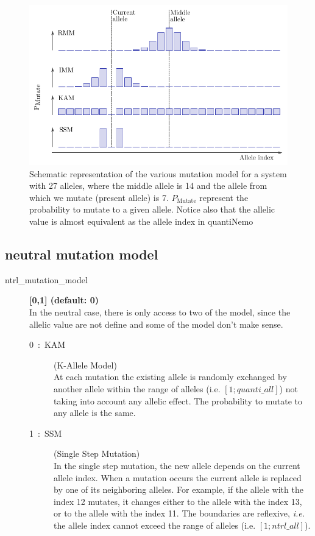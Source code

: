 \documentclass[letterpaper,12pt,oneside]{book}
\begin{document}
\begin{description}
\begin{figure}[htbp]
    \centering
        \includegraphics[width=1\textwidth]{mutation_model.pdf}
    \caption{Schematic representation of the various mutation model for a system with 27 alleles, where the middle allele is 14 and the allele from which we mutate (present allele) is 7. $P_{\text{Mutate}}$ represent the probability to mutate to a given allele. Notice also that the allelic value is almost equivalent as the allele index in quantiNemo}
    \label{fig:mutation_model}
\end{figure}

\end{description}

\subsection{neutral mutation model}
\begin{description}
\item[ntrl\_mutation\_model] \textbf{[0,1] (default: 0)}\\
In the neutral case, there is only access to two of the model, since the allelic value are not define and some of the model don't make sense. 
\begin{description}
\item[0~:~KAM] (K-Allele Model)\\
At each mutation the existing allele is randomly exchanged by another allele within the range of alleles (i.e. $[1; quanti\_all]$) not taking into account any allelic effect. The probability to mutate to any allele is the same.

\item[1~:~SSM] (Single Step Mutation)\\
In the single step mutation, the new allele depends on the current allele index. When a mutation occurs the current allele is replaced by one of its neighboring alleles. For example, if the allele with the index 12 mutates, it changes either to the allele with the index 13, or to the allele with the index 11. The boundaries are reflexive, \textit{i.e.} the allele index cannot exceed the range of alleles (i.e. $[1; ntrl\_all]$).
\end{description}
\end{description}
\end{document}
